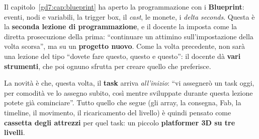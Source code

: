 Il capitolo~\ref{gd7:cap:blueprint} ha aperto la programmazione con i
\textbf{Blueprint}: eventi, nodi e variabili, la trigger box, il \emph{cast},
le monete, i \emph{delta seconds}. Questa è la \textbf{seconda lezione di
programmazione}, e il docente la imposta come la diretta prosecuzione della
prima: ``continuare un attimino sull'impostazione della volta scorsa'', ma su un
\textbf{progetto nuovo}. Come la volta precedente, non sarà una lezione del tipo
``dovete fare questo, questo e questo'': il docente dà \textbf{vari strumenti},
che poi ognuno sfrutta per creare quello che preferisce.

La novità è che, questa volta, il \textbf{task} arriva \emph{all'inizio}: ``vi
assegnerò un task oggi, per comodità ve lo assegno subito, così mentre
sviluppate durante questa lezione potete già cominciare''. Tutto quello che
segue (gli array, la consegna, Fab, la timeline, il movimento, il ricaricamento
del livello) è quindi pensato come \textbf{cassetta degli attrezzi} per quel
task: un piccolo \textbf{platformer 3D su tre livelli}.

